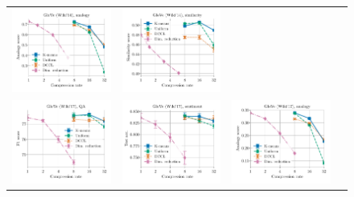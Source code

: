 \begin{figure}
\begin{tabular}{@{\hskip -0.0in}c@{\hskip -0.0in}c@{\hskip -0.0in}c@{\hskip -0.0in}c@{\hskip -0.0in}}
		\includegraphics[width=.245\linewidth]{figures/glove400k_intrinsics_google-mul_vs_compression_linx_stoc.pdf} &
		\includegraphics[width=.245\linewidth]{figures/glove400k_intrinsics_similarity-avg-score_vs_compression_linx_stoc.pdf} \\
		\includegraphics[width=.245\linewidth]{figures/glove-wiki400k-am_qa_best-f1_vs_compression_linx_stoc.pdf} &
		\includegraphics[width=.245\linewidth]{figures/glove-wiki400k-am_sentiment_sst_test-acc_vs_compression_linx_stoc.pdf} &
		\includegraphics[width=.245\linewidth]{figures/glove-wiki400k-am_intrinsics_google-mul_vs_compression_linx_stoc.pdf} &

\end{tabular}
\end{figure}
